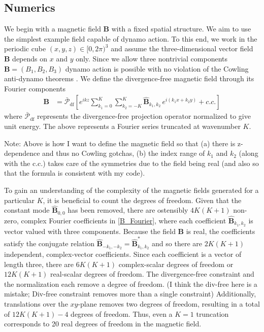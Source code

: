 \documentclass[onecolumn,showpacs,preprintnumbers,amsmath,amssymb]{revtex4-2}
\newcommand{\nick}[1]{{\color{orange}#1}}
\newcommand{\bvec}[1]{{\mathbf{#1}}}
\newcommand{\Bvec}{\bvec{B}}
\newcommand{\nproj}{ \bar{\mathcal{P}}_{\text{df}} }
\newcommand{\eikx}{e^{ i \left( k_1 x + k_2 y \right) }}
\begin{document}
\subsection{Numerics}

We begin with a magnetic field $\Bvec$ with a fixed spatial structure. We aim to use the simplest example field capable of dynamo action.
To this end, we work in the periodic cube $(x,y,z) \in [0, 2\pi)^3$ and assume the three-dimensional vector field $\Bvec$ depends  on $x$ and $y$ only. Since we allow three nontrivial components $\Bvec = (B_1, B_2, B_3)$ dynamo action is possible with no violation of the Cowling anti-dynamo theorems \cite{Moffatt2019}. We define the divergence-free magnetic field through its Fourier components 
\begin{align}
\label{B_Fourier}
\Bvec &= \nproj \left[ e^{i k z}
\sum_{k_1=0}^{K} \sum_{k_2=-K}^{K}
\hat{\Bvec}_{k_1, k_2} \, \eikx + c.c. \right]
\end{align}
where $\nproj$ represents the divergence-free projection operator normalized to give unit energy.
The above represents a Fourier series truncated at wavenumber $K$.

\nick{Note: Above is how I want to define the magnetic field so that (a) there is z-dependence and thus no Cowling gotchas, (b) the index range of $k_1$ and $k_2$ (along with the c.c.) takes care of the symmetries due to the field being real (and also so that the formula is consistent with my code)}.

To gain an understanding of the complexity of the magnetic fields generated for a particular $K$, it is beneficial to count the degrees of freedom. Given that the constant mode $\hat{\Bvec}_{0,0}$ has been removed, there are ostensibly $4K(K+1)$ non-zero, complex Fourier coefficients in \cref{B_Fourier}, where each coefficient $ \hat{\Bvec}_{k_1, k_2}$ is vector valued with three components. Because the field $\Bvec$ is real, the coefficients satisfy the conjugate relation $\hat{\Bvec}_{-k_1, -k_2} = \hat{\Bvec}_{k_1, k_2}^*$ and so there are $2K(K+1)$ independent, complex-vector coefficients. Since each coefficient is a vector of length three, there are $6K(K+1)$ complex-scalar degrees of freedom or $12K(K+1)$ real-scalar degrees of freedom.
The divergence-free constraint and the normalization each remove a degree of freedom. \nick{(I think the div-free here is a mistake; Div-free constraint removes more than a single constraint)}
Additionally, translations over the $xy$-plane removes two degrees of freedom, resulting in a total of $12K(K+1) - 4$ degrees of freedom. 
Thus, even a $K=1$ truncation corresponds to 20 real degrees of freedom in the magnetic field.
\end{document}
